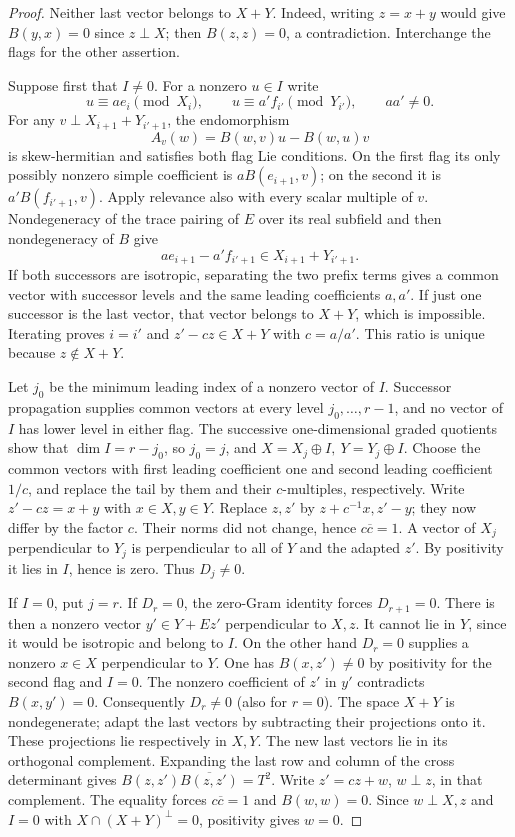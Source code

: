 \begin{proof}
Neither last vector belongs to \(X+Y\). Indeed, writing
\(z=x+y\) would give \(B(y,x)=0\) since \(z\perp X\);
then \(B(z,z)=0\), a contradiction. Interchange the
flags for the other assertion.

Suppose first that \(I\ne0\). For a nonzero \(u\in I\)
write
\[
 u\equiv a e_i\pmod{X_i},\qquad
 u\equiv a'f_{i'}\pmod{Y_{i'}},\qquad aa'\ne0.
\]
For any \(v\perp X_{i+1}+Y_{i'+1}\), the endomorphism
\[
 A_v(w)=B(w,v)u-B(w,u)v
\]
is skew-hermitian and satisfies both flag Lie conditions.
On the first flag its only possibly nonzero simple
coefficient is \(a B(e_{i+1},v)\); on the second it is
\(a'B(f_{i'+1},v)\). Apply relevance also with every
scalar multiple of \(v\). Nondegeneracy of the trace
pairing of \(E\) over its real subfield and then
nondegeneracy of \(B\) give
\[
 a e_{i+1}-a'f_{i'+1}\in X_{i+1}+Y_{i'+1}.
\]
If both successors are isotropic, separating the two
prefix terms gives a common vector with successor levels
and the same leading coefficients \(a,a'\). If just one
successor is the last vector, that vector belongs to
\(X+Y\), which is impossible. Iterating proves
\(i=i'\) and \(z'-c z\in X+Y\) with \(c=a/a'\).
This ratio is unique because \(z\notin X+Y\).

Let \(j_0\) be the minimum leading index of a nonzero
vector of \(I\). Successor propagation supplies common
vectors at every level \(j_0,\ldots,r-1\), and no vector
of \(I\) has lower level in either flag. The successive
one-dimensional graded quotients show that
\(\dim I=r-j_0\), so \(j_0=j\), and
\(X=X_j\oplus I,\ Y=Y_j\oplus I\).
Choose the common vectors with first leading coefficient
one and second leading coefficient \(1/c\), and replace
the tail by them and their \(c\)-multiples, respectively.
Write \(z'-c z=x+y\) with \(x\in X,y\in Y\). Replace
\(z,z'\) by \(z+c^{-1}x,z'-y\); they now differ by the
factor \(c\). Their norms did not change, hence
\(c\overline c=1\).
A vector of \(X_j\) perpendicular to \(Y_j\) is
perpendicular to all of \(Y\) and the adapted \(z'\).
By positivity it lies in \(I\), hence is zero.
Thus \(D_j\ne0\).

If \(I=0\), put \(j=r\). If \(D_r=0\), the zero-Gram
identity forces \(D_{r+1}=0\). There is then a nonzero
vector \(y'\in Y+Ez'\) perpendicular to \(X,z\).
It cannot lie in \(Y\), since it would be isotropic
and belong to \(I\). On the other hand \(D_r=0\)
supplies a nonzero \(x\in X\) perpendicular to \(Y\).
One has \(B(x,z')\ne0\) by positivity for the second
flag and \(I=0\). The nonzero coefficient of \(z'\)
in \(y'\) contradicts \(B(x,y')=0\).
Consequently \(D_r\ne0\) (also for \(r=0\)).
The space \(X+Y\) is nondegenerate; adapt the last
vectors by subtracting their projections onto it.
These projections lie respectively in \(X,Y\).
The new last vectors lie in its orthogonal complement.
Expanding the last row and column of the cross
determinant gives
\(B(z,z')\overline{B(z,z')}=T^2\).
Write \(z'=cz+w\), \(w\perp z\), in that complement.
The equality forces \(c\overline c=1\) and \(B(w,w)=0\).
Since \(w\perp X,z\) and \(I=0\) with
\(X\cap(X+Y)^\perp=0\), positivity gives \(w=0\).


\end{proof}
